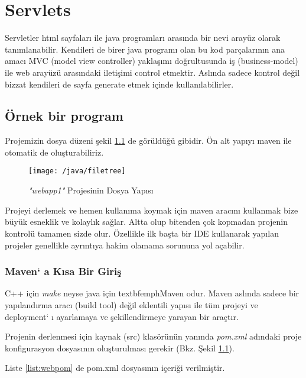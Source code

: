 \chapter{Servlets}
Servletler html sayfaları ile java programları arasında bir nevi arayüz olarak tanımlanabilir. Kendileri de birer java programı olan bu kod parçalarının ana amacı MVC (model view controller) yaklaşımı
doğrultusunda iş (business-model) ile web arayüzü arasındaki iletişimi control etmektir. Aslında sadece kontrol değil bizzat kendileri de sayfa generate etmek içinde kullanılabilirler. 

\section{Örnek bir program}
Projemizin dosya düzeni şekil \ref{fig:filetree} de görüldüğü gibidir. Ön alt yapıyı maven ile otomatik de oluşturabiliriz.
\begin{figure}[h]
\centering\texttt{[image: /java/filetree]}
\caption{\emph{"webapp1"} Projesinin Dosya Yapısı}
\label{fig:filetree}
\end{figure}
Projeyi derlemek ve hemen kullanıma koymak için maven aracını kullanmak bize büyük esneklik ve kolaylık sağlar. Altta olup bitenden çok kopmadan projenin kontrolü tamamen sizde olur. Özellikle ilk başta bir IDE kullanarak yapılan projeler genellikle ayrıntıya hakim olamama sorununa yol açabilir. 
\subsection{Maven` a Kısa Bir Giriş}%
\label{sub:mavengiris}
C++ için \emph{make} neyse java için textbf{emph{Maven}} odur. Maven aslında  
sadece bir yapılandırma aracı (build tool) değil eklentili yapısı ile tüm projeyi
ve deployment` ı ayarlamaya ve şekillendirmeye yarayan bir araçtır.

Projenin derlenmesi için kaynak (src) klasörünün yanında \emph{pom.xml} adındaki
proje konfigurasyon dosyasının oluşturulması gerekir (Bkz. Şekil \ref{fig:filetree}).

Liste \ref{list:webpom} de pom.xml dosyasının içeriği verilmiştir.

